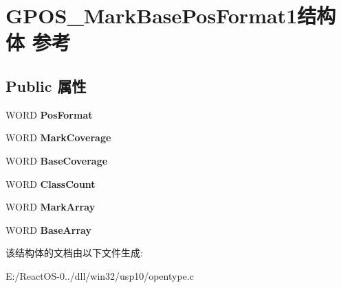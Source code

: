 \hypertarget{struct_g_p_o_s___mark_base_pos_format1}{}\section{G\+P\+O\+S\+\_\+\+Mark\+Base\+Pos\+Format1结构体 参考}
\label{struct_g_p_o_s___mark_base_pos_format1}
\subsection*{Public 属性}
\begin{DoxyCompactItemize}
\item 
\mbox{\label{struct_g_p_o_s___mark_base_pos_format1_a85a5b306065420d6326a0008bcdee5fe}} 
W\+O\+RD {\bfseries Pos\+Format}
\item 
\mbox{\label{struct_g_p_o_s___mark_base_pos_format1_ab6c7e7996eda95d58f10a6557fb24afc}} 
W\+O\+RD {\bfseries Mark\+Coverage}
\item 
\mbox{\label{struct_g_p_o_s___mark_base_pos_format1_acfe56d2e17930cd7fcdae816083f4f38}} 
W\+O\+RD {\bfseries Base\+Coverage}
\item 
\mbox{\label{struct_g_p_o_s___mark_base_pos_format1_aa3ec7c517215ae355db49364b8047ef1}} 
W\+O\+RD {\bfseries Class\+Count}
\item 
\mbox{\label{struct_g_p_o_s___mark_base_pos_format1_a9805018485baef0828963c9bd10a43db}} 
W\+O\+RD {\bfseries Mark\+Array}
\item 
\mbox{\label{struct_g_p_o_s___mark_base_pos_format1_a821303ca21b758c31b1ce9eb12fabcd4}} 
W\+O\+RD {\bfseries Base\+Array}
\end{DoxyCompactItemize}


该结构体的文档由以下文件生成\+:\begin{DoxyCompactItemize}
\item 
E\+:/\+React\+O\+S-\/0../dll/win32/usp10/opentype.\+c\end{DoxyCompactItemize}
